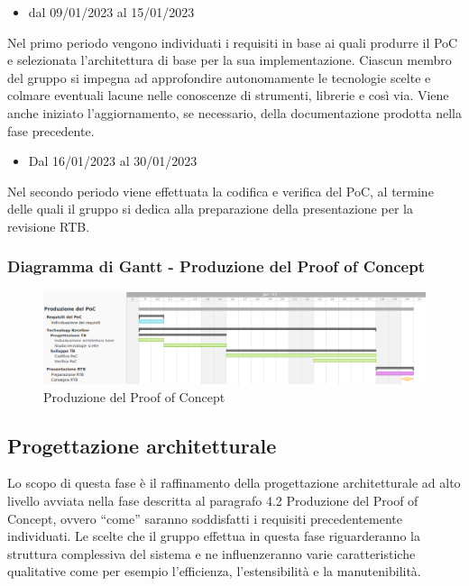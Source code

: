 \begin{itemize}
    \item dal 09/01/2023 al 15/01/2023
\end{itemize}
Nel primo periodo vengono individuati i requisiti in base ai quali produrre il PoC e selezionata l’architettura di base per la sua implementazione. Ciascun membro del gruppo si impegna ad approfondire autonomamente le tecnologie scelte e colmare eventuali lacune nelle conoscenze di strumenti, librerie e così via. Viene anche iniziato l'aggiornamento, se necessario, della documentazione prodotta nella fase precedente.

\begin{itemize}
    \item Dal 16/01/2023 al 30/01/2023
\end{itemize}
Nel secondo periodo viene effettuata la codifica e verifica del PoC, al termine delle quali il gruppo si dedica alla preparazione della presentazione per la revisione RTB.

\subsubsection{Diagramma di Gantt - Produzione del Proof of Concept}

\begin{figure}[H]
\centering
\includegraphics[width=\textwidth]{img/4_produzione.png}
\caption{Produzione del Proof of Concept}
\end{figure}

\subsection{Progettazione architetturale}
Lo scopo di questa fase è il raffinamento della progettazione architetturale ad alto livello avviata nella fase descritta al paragrafo 4.2 Produzione del Proof of Concept, ovvero “come” saranno soddisfatti i requisiti precedentemente individuati.
Le scelte che il gruppo effettua in questa fase riguarderanno la struttura complessiva del sistema e ne influenzeranno varie caratteristiche qualitative come per esempio l’efficienza, l’estensibilità e la manutenibilità.

